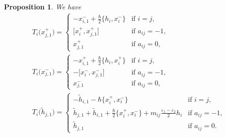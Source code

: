 \documentclass[10pt,a4paper]{amsart}
\newtheorem{prop}[thm]{Proposition}
\theoremstyle{definition}
\numberwithin{equation}{section}
\newcommand{\ve}{\varepsilon}
\begin{document}
\begin{prop}\label{prop:formula2}We have
\begin{gather*}
T_i\big(x_{j,1}^+\big) = \begin{cases}
-x_{i,1}^- + \tfrac{\hbar}{2}\big\{ h_i, x_i^- \big\} & \text{if $i=j$},\\
\big[x_i^+,x_{j,1}^+\big] & \text{if $a_{ij}=-1$},\\
x_{j,1}^+ & \text{if $a_{ij}=0$},
\end{cases} \\
T_i\big(x_{j,1}^-\big) = \begin{cases}
-x_{i,1}^+ + \tfrac{\hbar}{2}\big\{ h_i, x_i^+ \big\} & \text{if $i=j$},\\
-\big[x_{i}^-,x_{j,1}^-\big] & \text{if $a_{ij}=-1$},\\
x_{j,1}^- & \text{if $a_{ij}=0$},
\end{cases}
\\
T_i\big(\tilde{h}_{j,1}\big) = \begin{cases}
-\tilde{h}_{i,1} - \hbar \big\{ x_i^+,x_i^- \big\} & \text{if $i=j$},\\
\tilde{h}_{j,1} + \tilde{h}_{i,1} + \tfrac{\hbar}{2} \big\{ x_i^+,x_i^- \big\} + m_{ij}\tfrac{\ve_1 - \ve_2}{2} h_i & \text{if $a_{ij}=-1$},\\
\tilde{h}_{j,1} & \text{if $a_{ij}=0$}.
\end{cases}
\end{gather*}
\end{prop}
\end{document}
